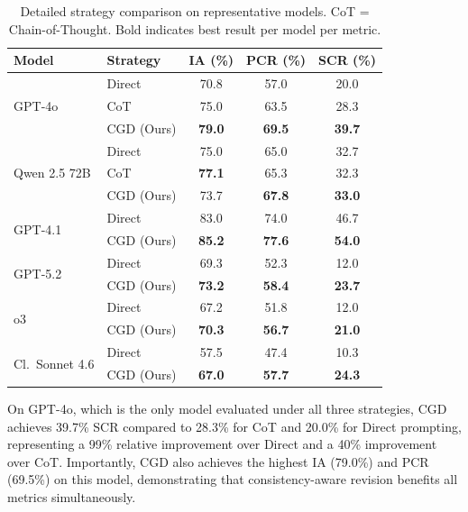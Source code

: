 \documentclass{article}
\newcommand{\method}{\textsc{CGD}}
\begin{document}
\begin{table}[ht]
\caption{Detailed strategy comparison on representative models. CoT = Chain-of-Thought. Bold indicates best result per model per metric.}
\label{tab:strategies}
\begin{center}
\small
\begin{tabular}{llccc}
\toprule
\textbf{Model} & \textbf{Strategy} & \textbf{IA (\%)} & \textbf{PCR (\%)} & \textbf{SCR (\%)} \\
\midrule
\multirow{3}{*}{GPT-4o}
 & Direct & 70.8 & 57.0 & 20.0 \\
 & CoT & 75.0 & 63.5 & 28.3 \\
 & \method{} (Ours) & \textbf{79.0} & \textbf{69.5} & \textbf{39.7} \\
\midrule
\multirow{3}{*}{Qwen 2.5 72B}
 & Direct & 75.0 & 65.0 & 32.7 \\
 & CoT & \textbf{77.1} & 65.3 & 32.3 \\
 & \method{} (Ours) & 73.7 & \textbf{67.8} & \textbf{33.0} \\
\midrule
\multirow{2}{*}{GPT-4.1}
 & Direct & 83.0 & 74.0 & 46.7 \\
 & \method{} (Ours) & \textbf{85.2} & \textbf{77.6} & \textbf{54.0} \\
\midrule
\multirow{2}{*}{GPT-5.2}
 & Direct & 69.3 & 52.3 & 12.0 \\
 & \method{} (Ours) & \textbf{73.2} & \textbf{58.4} & \textbf{23.7} \\
\midrule
\multirow{2}{*}{o3}
 & Direct & 67.2 & 51.8 & 12.0 \\
 & \method{} (Ours) & \textbf{70.3} & \textbf{56.7} & \textbf{21.0} \\
\midrule
\multirow{2}{*}{Cl.\ Sonnet 4.6}
 & Direct & 57.5 & 47.4 & 10.3 \\
 & \method{} (Ours) & \textbf{67.0} & \textbf{57.7} & \textbf{24.3} \\
\bottomrule
\end{tabular}
\end{center}
\end{table}

On GPT-4o, which is the only model evaluated under all three strategies, \method{} achieves 39.7\% SCR compared to 28.3\% for CoT and 20.0\% for Direct prompting, representing a 99\% relative improvement over Direct and a 40\% improvement over CoT. Importantly, \method{} also achieves the highest IA (79.0\%) and PCR (69.5\%) on this model, demonstrating that consistency-aware revision benefits all metrics simultaneously.
\end{document}
